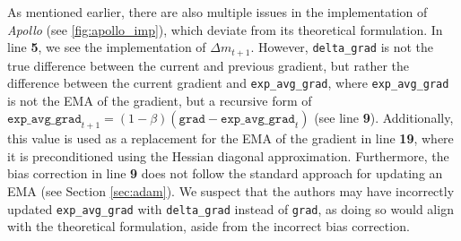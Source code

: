 As mentioned earlier, there are also multiple issues in the implementation of \emph{Apollo} (see \ref{fig:apollo_imp}),
which deviate from its theoretical formulation. In line \textbf{5}, we see the implementation of $\Delta m_{t+1}$.
However, \texttt{delta\_grad} is not the true difference between the current and previous gradient,
but rather the difference between the current gradient and \texttt{exp\_avg\_grad}, where \texttt{exp\_avg\_grad}
is not the EMA of the gradient, but a recursive form of $\texttt{exp\_avg\_grad}_{t+1} = (1-\beta) (\texttt{grad} - \texttt{exp\_avg\_grad}_{t})$ (see line \textbf{9}).
Additionally, this value is used as a replacement for the EMA of the gradient in line \textbf{19},
where it is preconditioned using the Hessian diagonal approximation.
Furthermore, the bias correction in line \textbf{9} does not follow the standard approach for updating an EMA (see Section \ref{sec:adam}).
We suspect that the authors may have incorrectly updated \texttt{exp\_avg\_grad} with \texttt{delta\_grad} instead of \texttt{grad},
as doing so would align with the theoretical formulation, aside from the incorrect bias correction.


